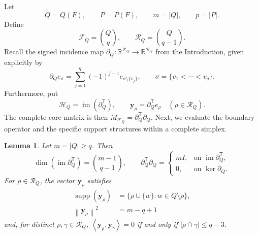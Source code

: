 \documentclass[11pt]{article}
\newtheorem{lemma}[theorem]{Lemma}
\newcommand{\R}{\mathbb{R}}
\newcommand{\im}{\operatorname{im}}
\newcommand{\Ker}{\operatorname{ker}}
\newcommand{\supp}{\operatorname{supp}}
\newcommand{\bd}{\partial}
\newcommand{\ip}[2]{\left\langle #1,#2\right\rangle}
\newcommand{\norm}[1]{\left\lVert #1\right\rVert}
\newcommand{\calR}{\mathcal{R}}
\newcommand{\calF}{\mathcal{F}}
\newcommand{\scrH}{\mathscr{H}}
\begin{document}
Let
\[
Q=Q(F),\qquad P=P(F),\qquad m=|Q|,\qquad p=|P|.
\]
Define
\[
\calF_Q=\binom Qq, \qquad  \calR_Q=\binom Q{q-1}.
\]
Recall the
signed incidence map \(\bd_Q:\R^{\calF_Q}\to\R^{\calR_Q}\) from the
Introduction, given explicitly by
\[
\bd_Q e_\sigma
=
\sum_{j=1}^q(-1)^{j-1}e_{\sigma\setminus\{v_j\}},
\qquad
\sigma=\{v_1<\cdots<v_q\}.
\]
Furthermore, put
\[
\scrH_Q=\im(\bd_Q^{\mathsf T}),
\qquad
\mathbf y_\rho=\bd_Q^{\mathsf T}e_\rho
\quad(\rho\in\calR_Q).
\]
The complete-core matrix is then
\(M_{\calF_Q}=\bd_Q^{\mathsf T}\bd_Q\).	
Next, we evaluate the boundary operator and the specific support structures within a complete simplex.
\begin{lemma}\label{lem:complete-simplex}
	Let \(m=|Q|\ge q\). Then
	\[ \dim(\im\bd_Q^{\mathsf T})=\binom{m-1}{q-1}, \qquad
	\bd_Q^{\mathsf T}\bd_Q=
	\begin{cases}
		mI,&\text{on }\im\bd_Q^{\mathsf T},\\
		0,&\text{on }\Ker\bd_Q.
	\end{cases}
	\]
	For \(\rho\in\calR_Q\), the vector \(\mathbf y_\rho\) satisfies
	\begin{align*}
		\supp(\mathbf y_\rho)&=\{\rho\cup\{w\}:w\in Q\setminus\rho\},\\
		\norm{\mathbf y_\rho}^2&=m-q+1
	\end{align*}
	and, for distinct \(\rho,\gamma\in\calR_Q\),
	\(\ip{\mathbf y_\rho}{\mathbf y_\gamma}=0\) if and only if
	\(|\rho\cap\gamma|\le q-3\).
\end{lemma}
\end{document}
